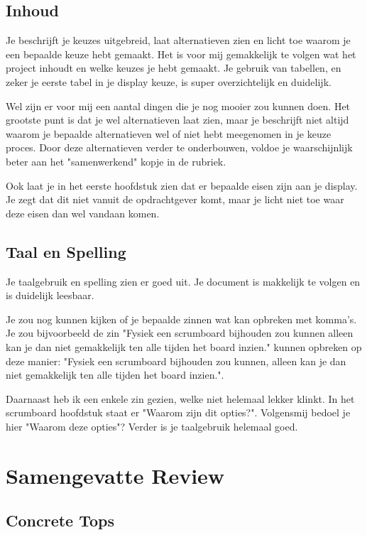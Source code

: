 \documentclass[a4paper]{report}
\begin{document}
\section{Inhoud}
Je beschrijft je keuzes uitgebreid, laat alternatieven zien en licht toe waarom je een bepaalde keuze hebt gemaakt.
Het is voor mij gemakkelijk te volgen wat het project inhoudt en welke keuzes je hebt gemaakt.
Je gebruik van tabellen, en zeker je eerste tabel in je display keuze, is super overzichtelijk en duidelijk.
\par\smallskip
Wel zijn er voor mij een aantal dingen die je nog mooier zou kunnen doen. 
Het grootste punt is dat je wel alternatieven laat zien, maar je beschrijft niet altijd waarom je bepaalde alternatieven wel of niet hebt meegenomen in je keuze proces.
Door deze alternatieven verder te onderbouwen, voldoe je waarschijnlijk beter aan het "samenwerkend" kopje in de rubriek\cite{rubriek}.
\par\smallskip 
Ook laat je in het eerste hoofdstuk zien dat er bepaalde eisen zijn aan je display. Je zegt dat dit niet vanuit de opdrachtgever komt, maar je licht niet toe waar deze eisen dan wel vandaan komen.

\section{Taal en Spelling}
Je taalgebruik en spelling zien er goed uit. Je document is makkelijk te volgen en is duidelijk leesbaar.
\par\smallskip 
Je zou nog kunnen kijken of je bepaalde zinnen wat kan opbreken met komma's. 
Je zou bijvoorbeeld de zin "Fysiek een scrumboard bijhouden zou kunnen alleen kan je dan niet gemakkelijk ten alle tijden het board inzien." kunnen opbreken op deze manier: "Fysiek een scrumboard bijhouden zou
kunnen, alleen kan je dan niet gemakkelijk ten alle tijden het board inzien.".
\par\smallskip 
Daarnaast heb ik een enkele zin gezien, welke niet helemaal lekker klinkt. 
In het scrumboard hoofdstuk staat er "Waarom zijn dit opties?". Volgensmij bedoel je hier "Waarom deze opties"?
Verder is je taalgebruik helemaal goed.

\chapter{Samengevatte Review}
\section{Concrete Tops}
\end{document}
